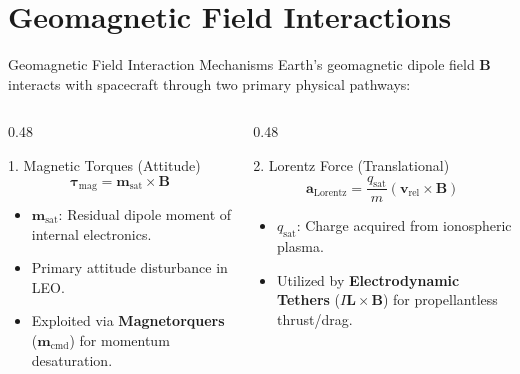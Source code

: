 \documentclass[aspectratio=169,11pt]{beamer}
\begin{document}
\section{Geomagnetic Field Interactions}

\begin{frame}{Geomagnetic Field Interaction Mechanisms}
    Earth's geomagnetic dipole field $\mathbf{B}$ interacts with spacecraft through two primary physical pathways:

    \vspace{-0.1cm}

    \begin{columns}[t]
        \begin{column}{0.48\textwidth}
            \begin{block}{1. Magnetic Torques (Attitude)}
                {\small
                \begin{equation*}
                    \boldsymbol{\tau}_{\text{mag}} = \mathbf{m}_{\text{sat}} \times \mathbf{B}
                \end{equation*}
                }
                \small
                \begin{itemize}
                    \item $\mathbf{m}_{\text{sat}}$: Residual dipole moment of internal electronics.
                    \item Primary attitude disturbance in LEO.
                    \item Exploited via \textbf{Magnetorquers} ($\mathbf{m}_{\text{cmd}}$) for momentum desaturation.
                \end{itemize}
            \end{block}
        \end{column}

        \begin{column}{0.48\textwidth}
            \begin{block}{2. Lorentz Force (Translational)}
                {\small
                \begin{equation*}
                    \mathbf{a}_{\text{Lorentz}} = \frac{q_{\text{sat}}}{m} \left( \mathbf{v}_{\text{rel}} \times \mathbf{B} \right)
                \end{equation*}
                }
                \small
                \begin{itemize}
                    \item $q_{\text{sat}}$: Charge acquired from ionospheric plasma.
                    \item Utilized by \textbf{Electrodynamic Tethers} ($I \mathbf{L} \times \mathbf{B}$) for propellantless thrust/drag.
                \end{itemize}
            \end{block}
        \end{column}
    \end{columns}
\end{frame}
\end{document}
